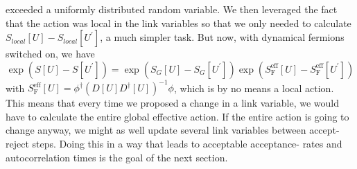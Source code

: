\documentclass[a4paper,10pt]{article}
\begin{document}
exceeded a uniformly distributed random variable.
We then leveraged the fact that the action was local in the link variables so that we only needed to calculate $S_{local}[U]-S_{local}\left[U^{\prime}\right]$, a much simpler task. But now, with dynamical fermions switched on, we have 
\begin{equation}
\exp \left(S[U]-S\left[U^{\prime}\right]\right)=\exp \left(S_{G}[U]-S_{G}\left[U^{\prime}\right]\right) \exp \left(S_{\mathrm{F}}^{\mathrm{eff}}[U]-S_{\mathrm{F}}^{\mathrm{eff}}\left[U^{\prime}\right]\right)
\end{equation}
with $S_{\mathrm{F}}^{\mathrm{eff}}[U] =\phi^{\dagger}\left(D[U] D^{\dagger}[U]\right)^{-1} \phi $, which is by no means a local action. This means that every time we proposed a change in a link variable, we would have to calculate the entire global effective action. If the entire action is going to change anyway, we might as well update several link variables between accept-reject steps. Doing this in a way that leads to acceptable acceptance- rates and autocorrelation times is the goal of the next section.
\end{document}
